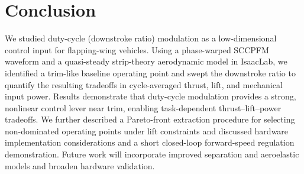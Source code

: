 \section{Conclusion}
We studied duty-cycle (downstroke ratio) modulation as a low-dimensional control input for flapping-wing vehicles.
Using a phase-warped SCCPFM waveform and a quasi-steady strip-theory aerodynamic model in IsaacLab, we identified a trim-like baseline operating point and swept the downstroke ratio to quantify the resulting tradeoffs in cycle-averaged thrust, lift, and mechanical input power.
Results demonstrate that duty-cycle modulation provides a strong, nonlinear control lever near trim, enabling task-dependent thrust--lift--power tradeoffs.
We further described a Pareto-front extraction procedure for selecting non-dominated operating points under lift constraints and discussed hardware implementation considerations and a short closed-loop forward-speed regulation demonstration.
Future work will incorporate improved separation and aeroelastic models and broaden hardware validation.
